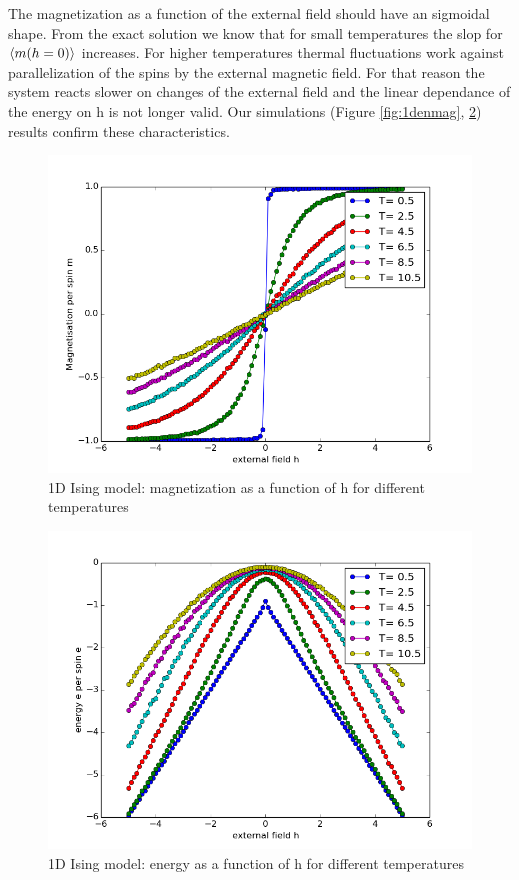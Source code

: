 \documentclass[12pt,a4paper,titlepage]{article}
\begin{document}
The magnetization as a function of the external field should have an sigmoidal shape. From the exact solution we know that for small temperatures the slop for $\braket{m(h=0)}$ increases. For higher temperatures thermal fluctuations work against parallelization of the spins by the external magnetic field. For that reason the system reacts slower on changes of the external field and the linear dependance of the energy on h is not longer valid. Our simulations (Figure \ref{fig:1denmag}, \ref{fig:1denmult}) results confirm these characteristics.



\begin{figure}
\centering
\includegraphics[width=12cm]{Plots/differnt_t_and_h_s_DOTS}
\caption{1D Ising model: magnetization as a function of h for different temperatures}
\label{fig:1dmagmult}
\end{figure}

\begin{figure}
\centering
\includegraphics[width=12cm]{Plots/differnt_t_and_h_s_ENERGY}
\caption{1D Ising model: energy as a function of h for different temperatures}
\label{fig:1denmult}
\end{figure}
\end{document}
